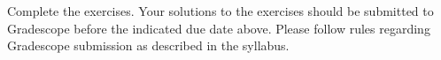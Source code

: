 \documentclass[addpoints, 11pt]{exam}
\begin{document}
\begin{center}
\end{center}
\addpoints


\vspace{.25cm}


 Complete the exercises. Your solutions to the exercises should be submitted to Gradescope before the indicated due date above. Please follow rules regarding Gradescope submission as described in the syllabus. \\
\end{document}
